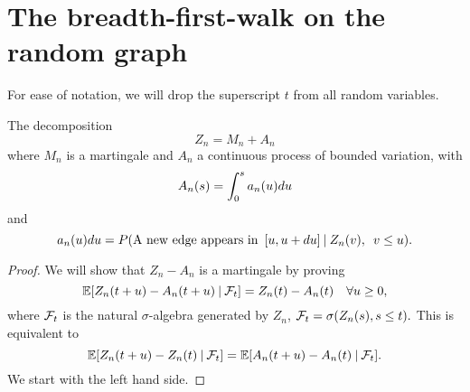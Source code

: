 
\chapter{The breadth-first-walk on the random graph}

For ease of notation, we will drop the superscript $t$ from all random variables.

\begin{lemma}
	The decomposition 
	\begin{equation} \label{decomp Zn}
	Z_n = M_n + A_n
	\end{equation}
	where $M_n$ is a martingale and $A_n$ a continuous process of bounded variation, with
	\begin{equation} \label{def An}
	A_n(s) = \int_{0}^{s} a_n(u)du
	\end{equation}
	and
	\begin{equation} \label{def an}
	a_n(u)du = P(\text{A new edge appears in} \enspace [u, u+du] \: | \: Z_n(v), \enspace v \leq u).
	\end{equation}
\end{lemma}
\begin{proof}
	We will show that
	$Z_n - A_n$
	is a martingale by proving
	\begin{equation} \label{Mn martingale}
		\mathbb{E}[ Z_n(t+u) - A_n(t+u) \: | \: \mathcal{F}_{t} ] = Z_n(t) - A_n(t) \quad \forall u \geq 0,
	\end{equation}
	where $\mathcal{F}_{t}$ is the natural $\sigma$-algebra generated by $Z_n$, 
	$\mathcal{F}_{t} = \sigma(Z_n(s), s \leq t).$
	This is equivalent to 
	\begin{equation}
	\mathbb{E}[Z_n(t+u) - Z_n(t) \: | \: \mathcal{F}_{t}] = \mathbb{E}[A_n(t+u) - A_n(t) \: | \: \mathcal{F}_{t}].
	\end{equation}
	We start with the left hand side. 
	
\end{proof}



